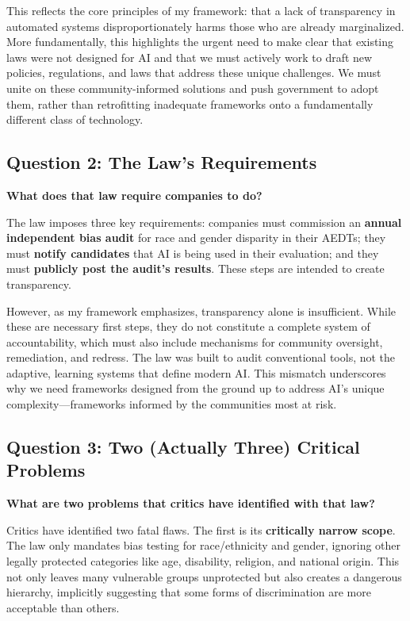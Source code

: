 \documentclass[12pt,letterpaper]{article}
\begin{document}
This reflects the core principles of my framework: that a lack of transparency in automated systems disproportionately harms those who are already marginalized. More fundamentally, this highlights the urgent need to make clear that existing laws were not designed for AI and that we must actively work to draft new policies, regulations, and laws that address these unique challenges. We must unite on these community-informed solutions and push government to adopt them, rather than retrofitting inadequate frameworks onto a fundamentally different class of technology.

\subsection*{Question 2: The Law's Requirements}
\textbf{What does that law require companies to do?}

The law imposes three key requirements: companies must commission an \textbf{annual independent bias audit} for race and gender disparity in their AEDTs; they must \textbf{notify candidates} that AI is being used in their evaluation; and they must \textbf{publicly post the audit's results}. These steps are intended to create transparency. 

However, as my framework emphasizes, transparency alone is insufficient. While these are necessary first steps, they do not constitute a complete system of accountability, which must also include mechanisms for community oversight, remediation, and redress. The law was built to audit conventional tools, not the adaptive, learning systems that define modern AI. This mismatch underscores why we need frameworks designed from the ground up to address AI's unique complexity—frameworks informed by the communities most at risk.

\subsection*{Question 3: Two (Actually Three) Critical Problems}
\textbf{What are two problems that critics have identified with that law?}

Critics have identified two fatal flaws. The first is its \textbf{critically narrow scope}. The law only mandates bias testing for race/ethnicity and gender, ignoring other legally protected categories like age, disability, religion, and national origin. This not only leaves many vulnerable groups unprotected but also creates a dangerous hierarchy, implicitly suggesting that some forms of discrimination are more acceptable than others.
\end{document}
